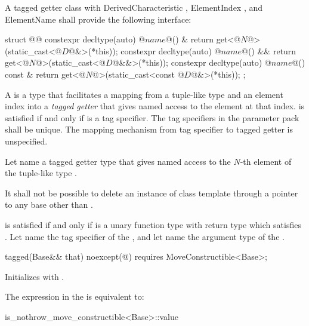\pnum A tagged getter class with DerivedCharacteristic , ElementIndex
, and ElementName  shall provide the following interface:

\begin{codeblock}
struct @@ {
  constexpr decltype(auto) @$name$@() &       { return get<@$N$@>(static_cast<@$D$@&>(*this)); }
  constexpr decltype(auto) @$name$@() &&      { return get<@$N$@>(static_cast<@$D$@&&>(*this)); }
  constexpr decltype(auto) @$name$@() const & { return get<@$N$@>(static_cast<const @$D$@&>(*this)); }
};
\end{codeblock}

\pnum
A  is a type that facilitates a mapping from a tuple-like type and an
element index into a \textit{tagged getter} that gives named access to the element at that index.
 is satisfied if and only if  is a tag specifier. The tag specifiers in the
 parameter pack shall be unique. \enternote The mapping mechanism from tag specifier to
tagged getter is unspecified.\exitnote

\pnum Let  name a tagged getter type that gives named
access to the $N$-th element of the tuple-like type .

\pnum It shall not be possible to delete an instance of class template  through a
pointer to any base other than .

\pnum
{} is satisfied if and only if  is a unary function
type with return type  which satisfies . Let
 name the tag specifier of the  , and let
 name the argument type of the  .


\begin{itemdecl}
tagged(Base&& that) noexcept(@\seebelow@)
  requires MoveConstructible<Base>;
\end{itemdecl}

\begin{itemdescr}
\pnum
\effects Initializes  with .

\pnum
\remarks The expression in the  is equivalent to:

\begin{codeblock}
is_nothrow_move_constructible<Base>::value
\end{codeblock}
\end{itemdescr}

